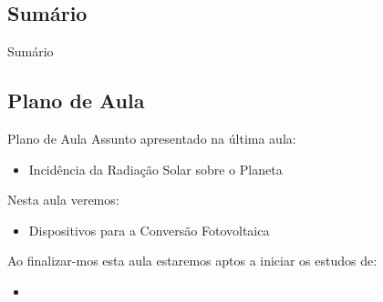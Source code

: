 
\subsection{Sumário}

\begin{frame}{Sumário}
\tableofcontents
\end{frame}

\subsection{Plano de Aula}

\begin{frame}{Plano de Aula}
Assunto apresentado na última aula: 
\begin{itemize}
\item Incidência da Radiação Solar sobre o Planeta
\end{itemize}

\vspace{0.5cm}
Nesta aula veremos:
\begin{itemize}
\item Dispositivos para a Conversão Fotovoltaica
\end{itemize}

\vspace{0.5cm}
Ao finalizar-mos esta aula estaremos aptos a iniciar os estudos de:
\begin{itemize}
\item 
\end{itemize}

\end{frame}
